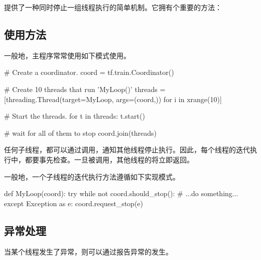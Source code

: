 \begin{content}

提供了一种同时停止一组线程执行的简单机制。它拥有个重要的方法：

\begin{enum}
\end{enum}

\subsection{使用方法}

一般地，主程序常常使用如下模式使用。

\begin{leftbar}
\begin{python}
# Create a coordinator.
coord = tf.train.Coordinator()

# Create 10 threads that run 'MyLoop()'
threads = [threading.Thread(target=MyLoop, args=(coord,)) 
          for i in xrange(10)]

# Start the threads.
for t in threads:
  t.start()
  
# wait for all of them to stop
coord.join(threads)
\end{python}
\end{leftbar}

任何子线程，都可以通过调用，通知其他线程停止执行。因此，每个线程的迭代执行中，都要事先检查。一旦被调用，其他线程的将立即返回。

一般地，一个子线程的迭代执行方法遵循如下实现模式。

\begin{leftbar}
\begin{python}
def MyLoop(coord):
  try
    while not coord.should_stop():
      # ...do something...
  except Exception as e:
    coord.request_stop(e)
\end{python}
\end{leftbar}

\subsection{异常处理}

当某个线程发生了异常，则可以通过报告异常的发生。


\end{content}
